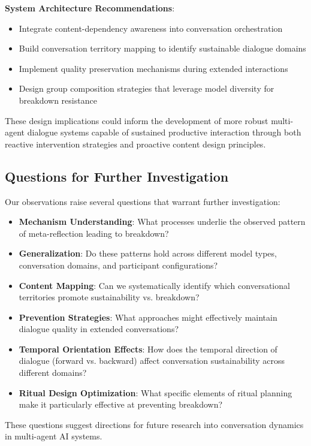 \documentclass[11pt,letterpaper]{article}
\begin{document}
\textbf{System Architecture Recommendations}:
\begin{itemize}
    \item Integrate content-dependency awareness into conversation orchestration
    \item Build conversation territory mapping to identify sustainable dialogue domains
    \item Implement quality preservation mechanisms during extended interactions
    \item Design group composition strategies that leverage model diversity for breakdown resistance
\end{itemize}

These design implications could inform the development of more robust multi-agent dialogue systems capable of sustained productive interaction through both reactive intervention strategies and proactive content design principles.

\subsection{Questions for Further Investigation}

Our observations raise several questions that warrant further investigation:

\begin{itemize}
    \item \textbf{Mechanism Understanding}: What processes underlie the observed pattern of meta-reflection leading to breakdown?
    \item \textbf{Generalization}: Do these patterns hold across different model types, conversation domains, and participant configurations?
    \item \textbf{Content Mapping}: Can we systematically identify which conversational territories promote sustainability vs. breakdown?
    \item \textbf{Prevention Strategies}: What approaches might effectively maintain dialogue quality in extended conversations?
    \item \textbf{Temporal Orientation Effects}: How does the temporal direction of dialogue (forward vs. backward) affect conversation sustainability across different domains?
    \item \textbf{Ritual Design Optimization}: What specific elements of ritual planning make it particularly effective at preventing breakdown?
\end{itemize}

These questions suggest directions for future research into conversation dynamics in multi-agent AI systems.
\end{document}
